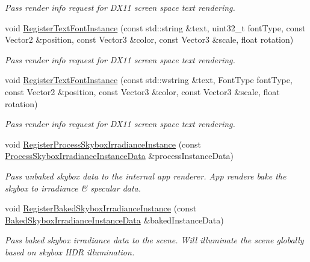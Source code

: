 \begin{DoxyCompactItemize}
\begin{DoxyCompactList}\small\item\em Pass render info request for D\+X11 screen space text rendering. \end{DoxyCompactList}\item 
void \hyperlink{classAppRenderer_a9d8be5bfc486bd5bf432366784477ecf}{Register\+Text\+Font\+Instance} (const std\+::string \&text, uint32\+\_\+t font\+Type, const Vector2 \&position, const Vector3 \&color, const Vector3 \&scale, float rotation)
\begin{DoxyCompactList}\small\item\em Pass render info request for D\+X11 screen space text rendering. \end{DoxyCompactList}\item 
void \hyperlink{classAppRenderer_ab636c593d1bb6b85dae508ee2945c9a8}{Register\+Text\+Font\+Instance} (const std\+::wstring \&text, Font\+Type font\+Type, const Vector2 \&position, const Vector3 \&color, const Vector3 \&scale, float rotation)
\begin{DoxyCompactList}\small\item\em Pass render info request for D\+X11 screen space text rendering. \end{DoxyCompactList}\item 
void \hyperlink{classAppRenderer_a46cea9dbc355592e2b3d74b8ef297175}{Register\+Process\+Skybox\+Irradiance\+Instance} (const \hyperlink{structProcessSkyboxIrradianceInstanceData}{Process\+Skybox\+Irradiance\+Instance\+Data} \&process\+Instance\+Data)
\begin{DoxyCompactList}\small\item\em Pass unbaked skybox data to the internal app renderer. App rendere bake the skybox to irradiance \& specular data. \end{DoxyCompactList}\item 
void \hyperlink{classAppRenderer_a596152f75036dfc597666d3ead6e0959}{Register\+Baked\+Skybox\+Irradiance\+Instance} (const \hyperlink{structBakedSkyboxIrradianceInstanceData}{Baked\+Skybox\+Irradiance\+Instance\+Data} \&baked\+Instance\+Data)
\begin{DoxyCompactList}\small\item\em Pass baked skybox irradiance data to the scene. Will illuminate the scene globally based on skybox H\+DR illumination. \end{DoxyCompactList}\item 
\mbox{\label{classAppRenderer_abcb06ec3a4f44df9a6b93c9da882e150}} 

\end{DoxyCompactItemize}
